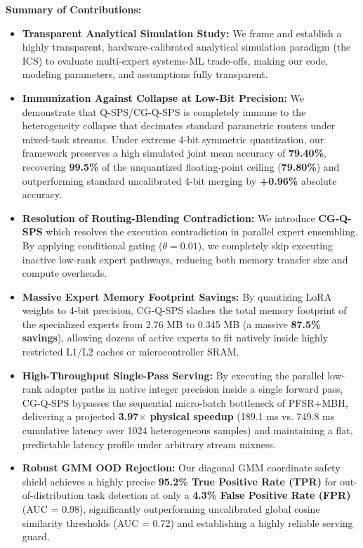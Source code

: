 \textbf{Summary of Contributions:}
\begin{itemize}
  \item \textbf{Transparent Analytical Simulation Study:} We frame and establish a highly transparent, hardware-calibrated analytical simulation paradigm (the ICS) to evaluate multi-expert systems-ML trade-offs, making our code, modeling parameters, and assumptions fully transparent.
  \item \textbf{Immunization Against Collapse at Low-Bit Precision:} We demonstrate that Q-SPS/CG-Q-SPS is completely immune to the heterogeneity collapse that decimates standard parametric routers under mixed-task streams. Under extreme 4-bit symmetric quantization, our framework preserves a high simulated joint mean accuracy of \textbf{79.40\%}, recovering \textbf{99.5\%} of the unquantized floating-point ceiling (\textbf{79.80\%}) and outperforming standard uncalibrated 4-bit merging by \textbf{+0.96\%} absolute accuracy.
  \item \textbf{Resolution of Routing-Blending Contradiction:} We introduce \textbf{CG-Q-SPS} which resolves the execution contradiction in parallel expert ensembling. By applying conditional gating ($\theta=0.01$), we completely skip executing inactive low-rank expert pathways, reducing both memory transfer size and compute overheads.
  \item \textbf{Massive Expert Memory Footprint Savings:} By quantizing LoRA weights to 4-bit precision, CG-Q-SPS slashes the total memory footprint of the specialized experts from 2.76 MB to 0.345 MB (a massive \textbf{87.5\% savings}), allowing dozens of active experts to fit natively inside highly restricted L1/L2 caches or microcontroller SRAM.
  \item \textbf{High-Throughput Single-Pass Serving:} By executing the parallel low-rank adapter paths in native integer precision inside a single forward pass, CG-Q-SPS bypasses the sequential micro-batch bottleneck of PFSR+MBH, delivering a projected \textbf{3.97$\times$ physical speedup} (189.1 ms vs. 749.8 ms cumulative latency over 1024 heterogeneous samples) and maintaining a flat, predictable latency profile under arbitrary stream mixness.
  \item \textbf{Robust GMM OOD Rejection:} Our diagonal GMM coordinate safety shield achieves a highly precise \textbf{95.2\% True Positive Rate (TPR)} for out-of-distribution task detection at only a \textbf{4.3\% False Positive Rate (FPR)} (AUC = 0.98), significantly outperforming uncalibrated global cosine similarity thresholds (AUC = 0.72) and establishing a highly reliable serving guard.

\end{itemize}
